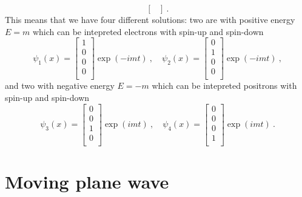 \begin{example}
\begin{equation*}
\begin{bmatrix}
            \end{bmatrix} ~.
        \end{equation*}
        This means that we have four different solutions: two are with positive energy $E = m$ which can be intepreted electrons with spin-up and spin-down
        \begin{equation*}
            \psi_1(x) = \begin{bmatrix}
                1 \\ 0 \\ 0 \\ 0 \\
            \end{bmatrix} \exp(-imt) ~, \quad \psi_2(x) = \begin{bmatrix}
                0 \\ 1 \\ 0 \\ 0 \\
            \end{bmatrix} \exp(-imt) ~,
        \end{equation*}
        and two with negative energy $E = - m$ which can be intepreted positrons with spin-up and spin-down
        \begin{equation*}
            \psi_3(x) = \begin{bmatrix}
                0 \\ 0 \\ 1 \\ 0 \\
            \end{bmatrix} \exp(imt) ~, \quad \psi_4(x) = \begin{bmatrix}
                0 \\ 0 \\ 0 \\ 1 \\
            \end{bmatrix} \exp(imt) ~.
        \end{equation*}
    \end{example}

\section{Moving plane wave}

